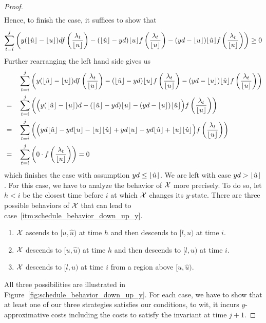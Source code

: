 \begin{proof}
\begin{align*}
\end{align*}
Hence, to finish the case, it suffices to show that
\begin{align*}
	\sum\limits_{t=i}^j\left(y(\lfloor\hat{u}\rfloor-\lfloor u\rfloor)df\left(\frac{\lambda_t}{\lfloor u\rfloor}\right)-(\lfloor\hat{u}\rfloor-yd)\lfloor u\rfloor f\left(\frac{\lambda_t}{\lfloor u\rfloor}\right)-(yd-\lfloor u\rfloor)\lfloor\hat{u}\rfloor f\left(\frac{\lambda_t}{\lfloor u\rfloor}\right)\right)\ge 0
\end{align*}
Further rearranging the left hand side gives us
\begin{align*}
	&&&\sum\limits_{t=i}^j\left(y(\lfloor\hat{u}\rfloor-\lfloor u\rfloor)df\left(\frac{\lambda_t}{\lfloor u\rfloor}\right)-(\lfloor\hat{u}\rfloor-yd)\lfloor u\rfloor f\left(\frac{\lambda_t}{\lfloor u\rfloor}\right)-(yd-\lfloor u\rfloor)\lfloor\hat{u}\rfloor f\left(\frac{\lambda_t}{\lfloor u\rfloor}\right)\right)\\
	&=&&\sum\limits_{t=i}^j\left(\Bigl(y(\lfloor\hat{u}\rfloor-\lfloor u\rfloor)d-(\lfloor\hat{u}\rfloor-yd)\lfloor u\rfloor-(yd-\lfloor u\rfloor)\lfloor\hat{u}\rfloor\Bigr)f\left(\frac{\lambda_t}{\lfloor u\rfloor}\right)\right)\\
	&=&&\sum\limits_{t=i}^j\left(\Bigl(yd\lfloor\hat{u}\rfloor-yd\lfloor u\rfloor-\lfloor u\rfloor\lfloor\hat{u}\rfloor+yd\lfloor u\rfloor-yd\lfloor\hat{u}\rfloor+\lfloor u\rfloor\lfloor\hat{u}\rfloor\Bigr)f\left(\frac{\lambda_t}{\lfloor u\rfloor}\right)\right)\\
	&=&&\sum\limits_{t=i}^j\left(0\cdot f\left(\frac{\lambda_t}{\lfloor u\rfloor}\right)\right)=0
\end{align*}
which finishes the case with assumption $yd\le\lfloor\hat{u}\rfloor$. We are left with case $yd>\lfloor\hat{u}\rfloor$. For this case, we have to analyze the behavior of $\mathcal{X}$ more precisely. To do so, let $h<i$ be the closest time before $i$ at which $\mathcal{X}$ changes its $y$-state. There are three possible behaviors of $\mathcal{X}$ that can lead to case~\ref{itm:schedule_behavior_down_up_y}.
\begin{enumerate}[label=(\roman*)]
	\item $\mathcal{X}$ ascends to $[u,\hat{u})$ at time $h$ and then descends to $[l,u)$ at time $i$.\label{itm:schedule_behavior_down_up_y_subcase_1}
	\item $\mathcal{X}$ descends to $[u,\hat{u})$ at time $h$ and then descends to $[l,u)$ at time $i$.\label{itm:schedule_behavior_down_up_y_subcase_2}
	\item $\mathcal{X}$ descends to $[l,u)$ at time $i$ from a region above $[u,\hat{u})$.\label{itm:schedule_behavior_down_up_y_subcase_3}
\end{enumerate}
All three possibilities are illustrated in Figure~\ref{fig:schedule_behavior_down_up_y}. For each case, we have to show that at least one of our three strategies satisfies our conditions, to wit, it incurs $y$-approximative costs including the costs to satisfy the invariant at time $j+1$.

\end{proof}
